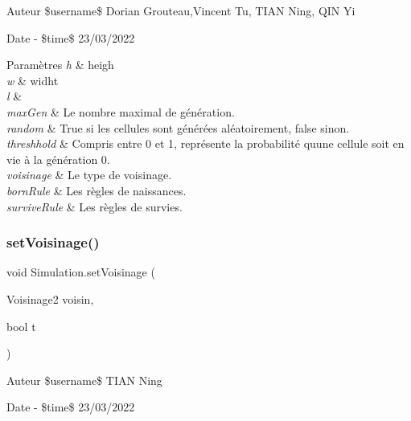 \begin{DoxyAuthor}{Auteur}
\$username\$ Dorian Grouteau,Vincent Tu, T\+I\+AN Ning, Q\+IN Yi 
\end{DoxyAuthor}
\begin{DoxyDate}{Date}
-\/ \$time\$ 23/03/2022 
\begin{DoxyParams}{Paramètres}
{\em h} & heigh\\
\hline
{\em w} & widht\\
\hline
{\em l} & \\
\hline
{\em max\+Gen} & Le nombre maximal de génération.\\
\hline
{\em random} & True si les cellules sont générées aléatoirement, false sinon.\\
\hline
{\em threshhold} & Compris entre 0 et 1, représente la probabilité qu\textquotesingle{}une cellule soit en vie à la génération 0.\\
\hline
{\em voisinage} & Le type de voisinage.\\
\hline
{\em born\+Rule} & Les règles de naissances.\\
\hline
{\em survive\+Rule} & Les règles de survies.\\
\hline
\end{DoxyParams}

\end{DoxyDate}
\mbox{\label{class_simulation_a9238f4dcd56a4945017fda48a76a3dc8}} 
\subsubsection{\texorpdfstring{set\+Voisinage()}{setVoisinage()}}
{\footnotesize\ttfamily void Simulation.\+set\+Voisinage (\begin{DoxyParamCaption}\item[{Voisinage2}]{voisin,  }\item[{bool}]{t }\end{DoxyParamCaption})\hspace{0.3cm}{\ttfamily [inline]}}





\begin{DoxyAuthor}{Auteur}
\$username\$ T\+I\+AN Ning 
\end{DoxyAuthor}
\begin{DoxyDate}{Date}
-\/ \$time\$ 23/03/2022
\end{DoxyDate}



